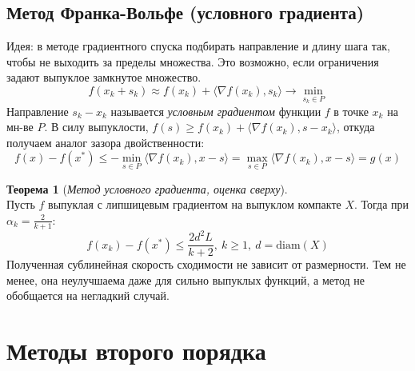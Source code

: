 \documentclass[11pt,a4paper]{report}
\def\le{\leqslant}
\def\ge{\geqslant}
\theoremstyle{definition}
\theoremstyle{definition}
\newtheorem{theorem}{Теорема}[section]
\theoremstyle{definition}
\begin{document}
	\subsection{Метод Франка-Вольфе (условного градиента)}
	Идея: в методе градиентного спуска подбирать направление и длину шага так, чтобы не выходить за пределы множества. Это возможно, если ограничения задают выпуклое замкнутое множество.\\
	$$
		f(x_k + s_k) \approx f(x_k) + \langle \nabla f(x_k), s_k \rangle \to \min_{s_k \in P}
	$$	
	Направление $ s_k - x_k $ называется \textit{условным градиентом} функции $ f $ в точке $ x_k $ на мн-ве $ P $.
	В силу выпуклости, $ f(s) \ge f(x_k) + \langle \nabla f(x_k), s - x_k \rangle $, откуда получаем аналог зазора двойственности:
	$$
		f(x) - f(x^*) \le -\min_{s \in P} \langle \nabla f(x_k), x - s \rangle = \max_{s \in P} \langle \nabla f(x_k), x - s \rangle = g(x)
	$$
	\begin{theorem}[\textit{Метод условного градиента, оценка сверху}]$  $\\
		Пусть $ f $ выпуклая с липшицевым градиентом на выпуклом компакте $ X $. Тогда при $ \alpha_k = \frac{2}{k+1} $:
		$$
			f(x_k) - f(x^*) \le \frac{2d^2L}{k+2},\ k \ge 1,\ d = \mathrm{diam}(X)
		$$
		Полученная сублинейная скорость сходимости не зависит от размерности. Тем не менее, она неулучшаема даже для сильно выпуклых функций, а метод не обобщается на негладкий случай.
	\end{theorem}
	\section{Методы второго порядка}
\end{document}
